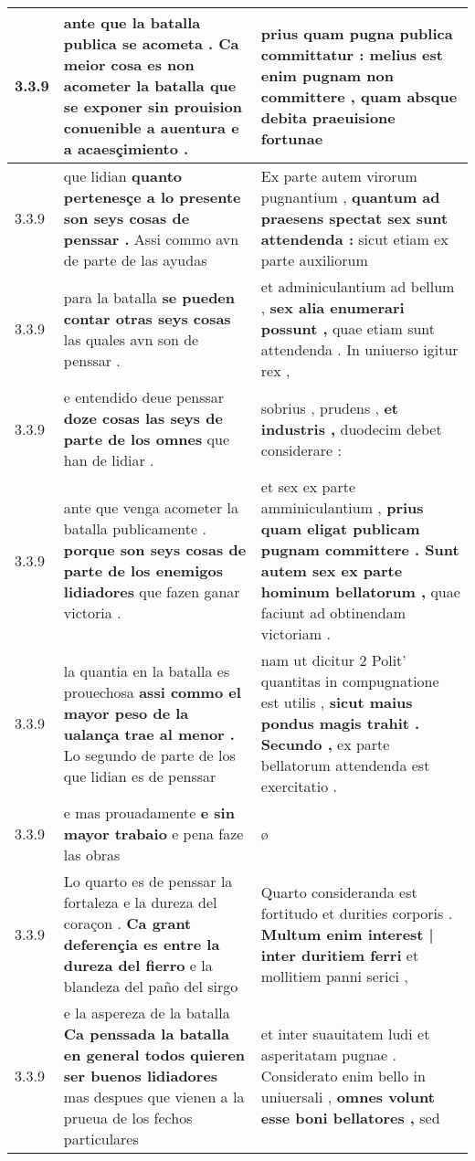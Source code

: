 \begin{tabular}{|p{1cm}|p{6.5cm}|p{6.5cm}|}
3.3.9 & ante que la batalla publica se acometa . \textbf{ Ca meior cosa es non acometer la batalla } que se exponer sin prouision conuenible a auentura e a acaesçimiento . & prius quam pugna publica committatur : \textbf{ melius est enim pugnam non committere , } quam absque debita praeuisione fortunae \\\hline
3.3.9 & que lidian \textbf{ quanto pertenesçe a lo presente son seys cosas de penssar . } Assi commo avn de parte de las ayudas & Ex parte autem virorum pugnantium , \textbf{ quantum ad praesens spectat sex sunt attendenda : } sicut etiam ex parte auxiliorum \\\hline
3.3.9 & para la batalla \textbf{ se pueden contar otras seys cosas } las quales avn son de penssar . & et adminiculantium ad bellum , \textbf{ sex alia enumerari possunt , } quae etiam sunt attendenda . In uniuerso igitur rex , \\\hline
3.3.9 & e entendido deue penssar \textbf{ doze cosas las seys de parte de los omnes } que han de lidiar . & sobrius , prudens , \textbf{ et industris , } duodecim debet considerare : \\\hline
3.3.9 & ante que venga acometer la batalla publicamente . \textbf{ porque son seys cosas de parte de los enemigos lidiadores } que fazen ganar victoria . & et sex ex parte amminiculantium , \textbf{ prius quam eligat publicam pugnam committere . Sunt autem sex ex parte hominum bellatorum , } quae faciunt ad obtinendam victoriam . \\\hline
3.3.9 & la quantia en la batalla es prouechosa \textbf{ assi commo el mayor peso de la ualança trae al menor . } Lo segundo de parte de los que lidian es de penssar & nam ut dicitur 2 Polit’ quantitas in compugnatione est utilis , \textbf{ sicut maius pondus magis trahit . Secundo , } ex parte bellatorum attendenda est exercitatio . \\\hline
3.3.9 & e mas prouadamente \textbf{ e sin mayor trabaio } e pena faze las obras & ø \\\hline
3.3.9 & Lo quarto es de penssar la fortaleza e la dureza del coraçon . \textbf{ Ca grant deferençia es entre la dureza del fierro } e la blandeza del paño del sirgo & Quarto consideranda est fortitudo et durities corporis . \textbf{ Multum enim interest | inter duritiem ferri } et mollitiem panni serici , \\\hline
3.3.9 & e la aspereza de la batalla \textbf{ Ca penssada la batalla en general todos quieren ser buenos lidiadores } mas despues que vienen a la prueua de los fechos particulares & et inter suauitatem ludi et asperitatam pugnae . Considerato enim bello in uniuersali , \textbf{ omnes volunt esse boni bellatores , } sed \\\hline

\end{tabular}
